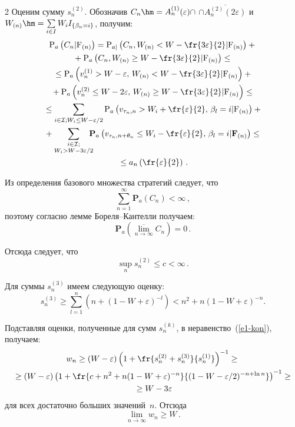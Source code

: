\begin{multicols}{2}
  Оценим сумму $s_n^{(2)}$. Обозначив 
$C_n\hm=A_n^{(1)}(\varepsilon)\cap$\linebreak 
$\cap\overline{A_n^{(2)}(2\varepsilon)}$ и $W_{(n)}\hm=\sum\limits_{i\in 
I} W_i I_{\{\beta_n=i\}}$, получим:
  \begin{multline*}
  \mathrm{P}_{a}\left(C_n\vert \mathrm{ F}_{(n)}\right)=
  \mathrm{P}_{a|} \left( C_n, W_{(n)}<W-\fr{3\varepsilon}{2}\vert \mathrm{
  F}_{(n)}\right) +{}\\
  {}+ \mathrm{P}_{a}\left( 
  C_n, W_{(n)}\geq W-\fr{3\varepsilon}{2}\vert \mathrm{
  F}_{(n)}\right)\leq{}\\
  {}\leq \mathrm{P}_{a}\left( v_n^{(1)}>W-\varepsilon,\, W_{(n)}<W-\fr{3\varepsilon}{2}\vert \mathrm{
  F}_{(n)}\right)+{}\\
  {}+
  \mathrm{P}_{a} \left( v_n^{(2)}\leq W-2\varepsilon,\, W_{(n)}\geq W-
\fr{3\varepsilon}{2}\vert \mathrm{
  F}_{(n)}\right)\leq{}\\
  {}\leq \sum\limits_{i\in \mathcal{I}; W_i\leq W- \varepsilon/2} \mathrm{P}_{a}\left(
  v_{\tau_n,n}>W_i+\fr{\varepsilon}{2},\, \beta_l=i\vert\mathrm{F}_{(n)}\right)+{}\\
  {}+\sum\limits_{\substack{{i\in \mathcal{I};}\\ {W_i> W- 3\varepsilon/2}}}\!\!\!\!
   \mathbf{P}_{a} \left( 
v_{\tau_n,n+\theta_n}\leq W_i-\fr{\varepsilon}{2},\,\beta_l=i\vert\mathbf{F}_{(n)}\right)\leq {}\\
{}\leq
a_n\left( \fr{\varepsilon}{2}\right)\,.
  \end{multline*}
  
  Из определения базового множества стратегий следует, что
  $$
  \sum\limits_{n=1}^\infty \mathbf{P}_{a} (C_n)<\infty\,,
  $$
поэтому согласно лемме Бо\-ре\-ля--Кан\-тел\-ли полу\-чаем:
\begin{equation}
\mathbf{P}_{a}\left( \overline{\lim\limits_{n\rightarrow\infty}} C_n\right) =0\,.
\label{e3-kon}
\end{equation}
  
  Отсюда следует, что
  $$
  \sup\limits_n s_n^{(2)}\leq c<\infty\,.
  $$
  
  Для суммы $s_n^{(3)}$ имеем следующую оценку:
  $$
  s_n^{(3)}\geq \sum\limits_{l=1}^n \left(n+(1-W+\varepsilon)^{-l}\right)< n^2+n(1-
W+\varepsilon)^{-n}.
  $$
  
  Подставляя оценки, полученные для сумм $s_n^{(k)}$, в неравенство~(\ref{e1-kon}), 
получаем:
  \begin{multline*}
  w_n\geq (W-\varepsilon) \left( 1+\fr{s_n^{(2)}+s_n^{(3)}}{s_n^{(1)}}\right)^{-1}\geq 
{}\\
  {}\geq (W-\varepsilon)\left( 1+\fr{c+n^2+n(1-W+\varepsilon)^{-n}}{(1-W-\varepsilon/2)^{-
n+\ln n}}\right)^{-1}\geq{}\\
{}\geq W-3\varepsilon
  \end{multline*}
для всех достаточно больших значений~$n$. Отсюда
\begin{equation}
\lim\limits_{\overline{n\rightarrow\infty}} w_n\geq W\,.
\label{e4-kon}
\end{equation}
  

\end{multicols}
